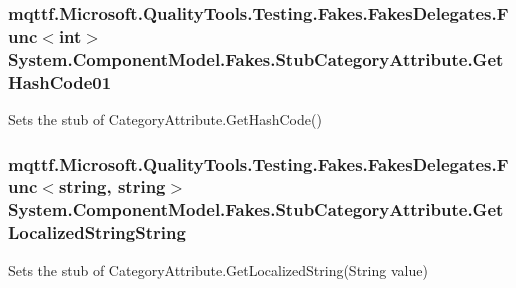 \hypertarget{class_system_1_1_component_model_1_1_fakes_1_1_stub_category_attribute_ac52de136ce0012515c82150dc51b3bb8}{
\subsubsection[{Get\-Hash\-Code01}]{\setlength{\rightskip}{0pt plus 5cm}mqttf.\-Microsoft.\-Quality\-Tools.\-Testing.\-Fakes.\-Fakes\-Delegates.\-Func$<$int$>$ System.\-Component\-Model.\-Fakes.\-Stub\-Category\-Attribute.\-Get\-Hash\-Code01}}\label{class_system_1_1_component_model_1_1_fakes_1_1_stub_category_attribute_ac52de136ce0012515c82150dc51b3bb8}


Sets the stub of Category\-Attribute.\-Get\-Hash\-Code()

\hypertarget{class_system_1_1_component_model_1_1_fakes_1_1_stub_category_attribute_ac4c694f830ead59f093b2b4eccbcef45}{
\subsubsection[{Get\-Localized\-String\-String}]{\setlength{\rightskip}{0pt plus 5cm}mqttf.\-Microsoft.\-Quality\-Tools.\-Testing.\-Fakes.\-Fakes\-Delegates.\-Func$<$string, string$>$ System.\-Component\-Model.\-Fakes.\-Stub\-Category\-Attribute.\-Get\-Localized\-String\-String}}\label{class_system_1_1_component_model_1_1_fakes_1_1_stub_category_attribute_ac4c694f830ead59f093b2b4eccbcef45}


Sets the stub of Category\-Attribute.\-Get\-Localized\-String(\-String value)

